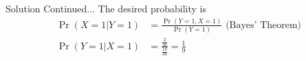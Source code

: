 \documentclass{beamer}
\providecommand{\pr}[1]{\ensuremath{\Pr\left(#1\right)}}
\begin{document}
\begin{frame}
        \begin{block}{Solution Continued...}
            The desired probability is
            \begin{align}
                \pr{X=1 | Y=1} &= \frac{\pr{Y=1, X=1}}{\pr{Y=1}} \text{ (Bayes' Theorem)}\\
                \pr{Y=1 | X=1} &= \frac{\frac{2}{36}}{\frac{18}{36}} = \frac{1}{9}
            \end{align}
         
        \end{block}
    \end{frame}
\end{document}
